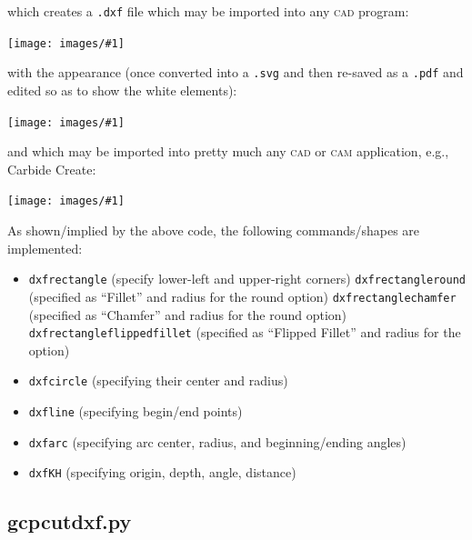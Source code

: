 \documentclass{ltxdoc}
\newcommand{\includeimage}[1]{\bigskip\noindent\texttt{[image: images/\#1]}\bigskip}
\begin{document}
\addtocounter{gcpdxfpy}{124}

\noindent which creates a \verb|.dxf| file which may be imported into any \textsc{cad} program:

\bigskip

\includeimage{gcpdxf.png}

\bigskip


\noindent with the appearance (once converted into a \verb|.svg| and then re-saved as a \verb|.pdf| and edited so as to show the white elements):

\bigskip

\includeimage{gcpdxf.pdf}

\bigskip

\noindent and which may be imported into pretty much any \textsc{cad} or \textsc{cam} application, e.g., Carbide Create:

\bigskip

\includeimage{gcpdxf_carbidecreate_v9.png}

\bigskip

As shown/implied by the above code, the following commands/shapes are implemented:

\begin{itemize}
\item \verb|dxfrectangle| (specify lower-left and upper-right corners)
\subitem\verb|dxfrectangleround| (specified as ``Fillet'' and radius for the round option)
\subitem\verb|dxfrectanglechamfer| (specified as ``Chamfer'' and radius for the round option)
\subitem\verb|dxfrectangleflippedfillet| (specified as ``Flipped Fillet'' and radius for the option)
\item \verb|dxfcircle| (specifying their center and radius)
\item \verb|dxfline| (specifying begin/end points)
\item \verb|dxfarc| (specifying arc center, radius, and beginning/ending angles)
\item \verb|dxfKH| (specifying origin, depth, angle, distance)
 \end{itemize}


\subsection{gcpcutdxf.py}
\end{document}
